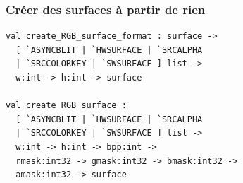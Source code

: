 \begin{frame}[fragile]
	\frametitle{Créer des surfaces à partir de rien}
	\lstset{basicstyle=\footnotesize}
	\begin{lstlisting}
val create_RGB_surface_format : surface ->
  [ `ASYNCBLIT | `HWSURFACE | `SRCALPHA 
  | `SRCCOLORKEY | `SWSURFACE ] list ->
  w:int -> h:int -> surface

val create_RGB_surface : 
  [ `ASYNCBLIT | `HWSURFACE | `SRCALPHA 
  | `SRCCOLORKEY | `SWSURFACE ] list ->
  w:int -> h:int -> bpp:int ->
  rmask:int32 -> gmask:int32 -> bmask:int32 ->
  amask:int32 -> surface
	\end{lstlisting}
\end{frame}
